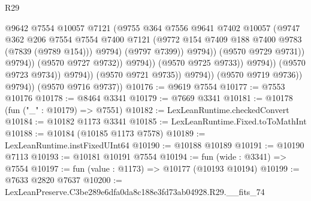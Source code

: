 \begin{lexlean}{R29}
\begin{coremodule}
                                              @9642
                                              @7554
                                              @10057
                                              @7121
                                              (@9755
                                                @364
                                                @7556
                                                @9641
                                                @7402
                                                @10057
                                                (@9747
                                                  @362
                                                  @206
                                                  @7554
                                                  @7554
                                                  @7400
                                                  @7121
                                                  (@9772
                                                    @154
                                                    @7409
                                                    @188
                                                    @7400
                                                    @9783
                                                    (@7839 (@9789 @154)))
                                                  @9794)
                                                (@9797 @7399))
                                              @9794))
                                          (@9570 @9729 @9731))
                                        @9794))
                                    (@9570 @9727 @9732))
                                  @9794))
                              (@9570 @9725 @9733))
                            @9794))
                        (@9570 @9723 @9734))
                      @9794))
                  (@9570 @9721 @9735))
                @9794))
            (@9570 @9719 @9736))
          @9794))
      (@9570 @9716 @9737))
@10176 := @9619 @7554
@10177 := @7553 @10176
@10178 := @8464 @3341
@10179 := @7669 @3341
@10181 := @10178 (fun ("_" : @10179) => @7551)
@10182 := LexLeanRuntime.checkedConvert
@10184 := @10182 @1173 @3341
@10185 := LexLeanRuntime.Fixed.toToMathInt
@10188 := @10184 (@10185 @1173 @7578)
@10189 := LexLeanRuntime.instFixedUInt64
@10190 := @10188 @10189
@10191 := @10190 @7113
@10193 := @10181 @10191 @7554
@10194 := fun (wide : @3341) => @7554
@10197 := fun (value : @1173) => @10177 (@10193 @10194)
@10199 := @7633 @2820 @7637
@10200 := LexLeanPreserve.C3be289e6dfa0da8c188e3fd73ab04928.R29.__fits_74

\end{coremodule}
\end{lexlean}
